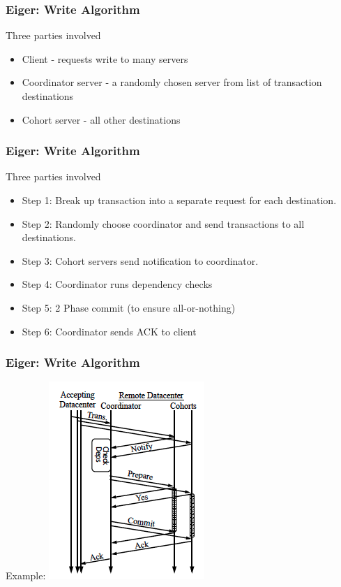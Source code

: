 \documentclass{beamer}
\begin{document}
\begin{frame}
\frametitle{Eiger: Write Algorithm}
Three parties involved
\begin{itemize}
	\item Client - requests write to many servers
	\item Coordinator server - a randomly chosen server from list of transaction destinations
	\item Cohort server - all other destinations
\end{itemize}  
\end{frame}



\begin{frame}
\frametitle{Eiger: Write Algorithm}
Three parties involved
\begin{itemize}
	\item Step 1: Break up transaction into a separate request for each destination.
	\item Step 2: Randomly choose coordinator and send transactions to all destinations.
	\item Step 3: Cohort servers send notification to coordinator.
	\item Step 4: Coordinator runs dependency checks
	\item Step 5: 2 Phase commit (to ensure all-or-nothing)
	\item Step 6: Coordinator sends ACK to client
\end{itemize}  
\end{frame}

\begin{frame}
\frametitle{Eiger: Write Algorithm}
Example:
\includegraphics[scale=0.5]{Figure_Write_Transaction.png}
\end{frame}
\end{document}
